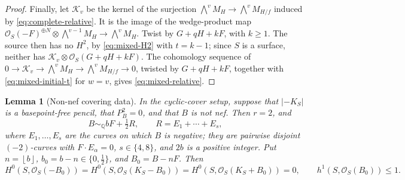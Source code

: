 \documentclass[11pt,reqno]{amsart}
\numberwithin{equation}{section}
\newtheorem{lemma}[lemma]{Lemma}
\theoremstyle{remark}
\newcommand{\sshf}[1]{\mathcal{O}_{#1}}
\newcommand{\shf}[1]{\mathscr{#1}}
\newcommand{\floor}[1]{\left\lfloor #1\right\rfloor}
\begin{document}
\begin{proof}
Finally, let \(\shf{K}_v\) be the kernel of the surjection \(\bigwedge^vM_H\to\bigwedge^vM_{H/f}\) induced by \eqref{eq:complete-relative}. It is the image of the wedge-product map \(\sshf{S}(-F)^{\oplus N}\otimes\bigwedge^{v-1}M_H\to\bigwedge^vM_H\). Twist by \(G+qH+kF\), with \(k\geq1\). The source then has no \(H^2\), by \eqref{eq:mixed-H2} with \(t=k-1\); since \(S\) is a surface, neither has \(\shf{K}_v\otimes\sshf{S}(G+qH+kF)\). The cohomology sequence of \(0\to\shf{K}_v\to\bigwedge^vM_H\to\bigwedge^vM_{H/f}\to0\), twisted by \(G+qH+kF\), together with \eqref{eq:mixed-initial-t} for \(w=v\), gives \eqref{eq:mixed-relative}.
\end{proof}

\begin{lemma}[Non-nef covering data]\label{lem:small-vertical}
In the cyclic-cover setup, suppose that \(|-K_S|\) is a basepoint-free pencil, that \(P_B^2=0\), and that \(B\) is not nef. Then \(r=2\), and
\[
 B\sim_{\mathbb{Q}}bF+\tfrac12R,\qquad R=E_1+\cdots+E_s,
\]
where \(E_1,\dots,E_s\) are the curves on which \(B\) is negative; they are pairwise disjoint \((-2)\)-curves with \(F\cdot E_\alpha=0\), \(s\in\{4,8\}\), and \(2b\) is a positive integer. Put \(n=\floor b\), \(b_0=b-n\in\{0,\tfrac12\}\), and \(B_0=B-nF\). Then
\[
 H^0(S,\sshf{S}(-B_0))=H^0(S,\sshf{S}(K_S-B_0))=H^0(S,\sshf{S}(K_S+B_0))=0,
 \qquad h^1(S,\sshf{S}(B_0))\leq1.
\]
\end{lemma}
\end{document}
